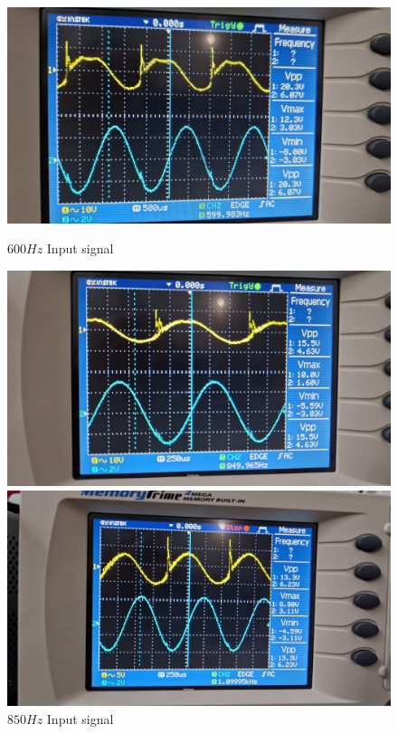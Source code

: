 \begin{figure}[h]
\begin{minipage}{.4\textwidth}
        \includegraphics[width=1\linewidth]{assets/p2-exp-600.png}
        \caption{$600Hz$ Input signal}
        \label{fig:p2-exp-600}
    \end{minipage}%
    \begin{minipage}{.4\textwidth}
        \includegraphics[width=1\linewidth]{assets/p2-exp-850.png}
        \caption{$850Hz$ Input signal}
        \label{fig:p2-exp-850}
    \end{minipage}
    \begin{minipage}{.4\textwidth}
        \includegraphics[width=1\linewidth]{assets/p2-exp-1.1.png}

\end{minipage}
\end{figure}

